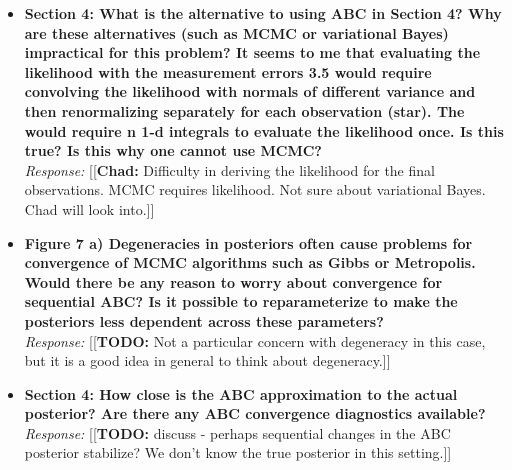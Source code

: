 \documentclass[11pt, oneside]{article}   	%
\newcommand{\chad}[1]{{\color{cyan}[[\textbf{Chad: }#1]]}}
\newcommand{\todo}[1]{{\color{red}[[\textbf{TODO: }#1]]}}
\begin{document}
\begin{itemize}
\item  {\bf Section 4: What is the alternative to using ABC in Section 4? Why are these alternatives (such as MCMC or variational Bayes) impractical for this problem? It seems to me that evaluating the likelihood with the measurement errors 3.5 would require convolving the likelihood with normals of different variance and then renormalizing separately for each observation (star). The would require n 1-d integrals to evaluate the likelihood once. Is this true? Is this why one cannot use MCMC?}\\
\noindent \emph{Response:} \chad{Difficulty in deriving the likelihood for the final observations. MCMC requires likelihood. Not sure about variational Bayes. Chad will look into.}
\bigskip

\item  {\bf Figure 7 a) Degeneracies in posteriors often cause problems for convergence of MCMC algorithms such as Gibbs or Metropolis. Would there be any reason to worry about convergence for sequential ABC? Is it possible to reparameterize to make the posteriors less dependent across these parameters?} \\
\noindent \emph{Response:} \todo{Not a particular concern with degeneracy in this case, but it is a good idea in general to think
about degeneracy.}
\bigskip

\item  {\bf  Section 4: How close is the ABC approximation to the actual posterior? Are there any ABC convergence diagnostics available?} \\
\noindent \emph{Response:} \todo{discuss - perhaps sequential changes in the ABC posterior stabilize?  We don't know the true posterior in this setting.}
\bigskip
\end{itemize}


\\
\end{document}
